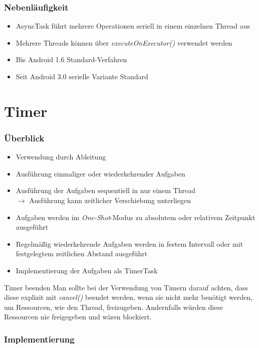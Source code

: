 \begin{frame}
   \frametitle{Nebenläufigkeit}
   \begin{itemize}
		\item AsyncTask führt mehrere Operationen seriell in einem einzelnen Thread aus
		\item Mehrere Threads können über \emph{executeOnExecutor()} verwendet werden
		\item Bis Android 1.6 Standard-Verfahren
		\item Seit Android 3.0 serielle Variante Standard
   \end{itemize}
\end{frame}

\section{Timer}
\begin{frame}
   \frametitle{Überblick}
   \begin{itemize}
     	\item Verwendung durch Ableitung
     	\item Ausführung einmaliger oder wiederkehrender Aufgaben
     	\item Ausführung der Aufgaben sequentiell in nur einem Thread\\
     		$\rightarrow$ Ausführung kann zeitlicher Verschiebung unterliegen
     	\item Aufgaben werden im \emph{One-Shot}-Modus zu absolutem 
     		oder relativem Zeitpunkt ausgeführt
     	\item Regelmäßig wiederkehrende Aufgaben werden in festem Intervall oder 
     		mit festgelegtem zeitlichen Abstand ausgeführt
     	\item Implementierung der Aufgaben als TimerTask
   \end{itemize}
   
   \begin{alertblock}{Timer beenden}
   	Man sollte bei der Verwendung von Timern darauf achten, dass diese 
		explizit mit \emph{cancel()} beendet werden, wenn sie nicht mehr benötigt werden, 
		um Ressourcen, wie den Thread, freizugeben. Andernfalls würden diese Ressourcen 
		nie freigegeben und wären blockiert.
   \end{alertblock}
\end{frame}

\begin{frame}
   \frametitle{Implementierung}
	
\end{frame}


